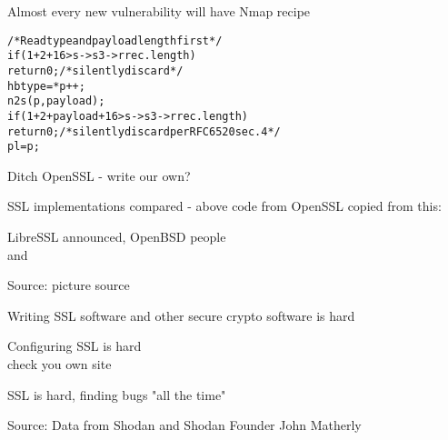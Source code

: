 \documentclass[Screen16to9,17pt]{foils}
\begin{document}
\centerline{Almost every new vulnerability will have Nmap recipe}


\begin{alltt}
  /* Read type and payload length first */
    if (1 + 2 + 16 > s->s3->rrec.length)
        return 0; /* silently discard */
    hbtype = *p++;
    n2s(p, payload);
    if (1 + 2 + payload + 16 > s->s3->rrec.length)
        return 0; /* silently discard per RFC 6520 sec. 4 */
    pl = p;
\end{alltt}

\begin{list1}
\item Ditch OpenSSL - write our own?
\item SSL implementations compared - above code from OpenSSL copied from this:\\
\item LibreSSL announced, OpenBSD people\\
  and 
\end{list1}


Source: picture source\\ {\footnotesize{}}
\begin{list2}
\item Writing SSL software and other secure crypto software is hard
\item Configuring SSL is hard\\
check you own site 
\item SSL is hard, finding bugs "all the time"\\
\end{list2}



Source: Data from Shodan and Shodan Founder John Matherly



\end{document}
